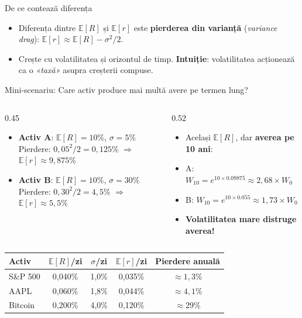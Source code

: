\documentclass[9pt, aspectratio=169, t]{beamer}
\theoremstyle{definition}
\newcommand{\E}{\mathbb{E}}
\begin{document}
\begin{frame}{De ce contează diferența}
\begin{itemize}\small\setlength{\itemsep}{0pt}
    \item Diferența dintre $\E[R]$ și $\E[r]$ este \textbf{pierderea din varianță} (\textit{variance drag}): $\E[r] \approx \E[R] - \sigma^2/2$.
    \item Crește cu volatilitatea și orizontul de timp. \textbf{Intuiție}: volatilitatea acționează ca o \textit{«taxă»} asupra creșterii compuse.
\end{itemize}
\vspace{0.05cm}
\begin{exampleblock}{Mini-scenariu: Care activ produce mai multă avere pe termen lung?}
\begin{columns}[T]
\begin{column}{0.45\textwidth}
\begin{itemize}\small\setlength{\itemsep}{1pt}
    \item \textbf{Activ A}: $\E[R] = 10\%$, $\sigma = 5\%$\\
    Pierdere: $0{,}05^2/2 = 0{,}125\%$ $\Rightarrow$ $\E[r] \approx 9{,}875\%$
    \item \textbf{Activ B}: $\E[R] = 10\%$, $\sigma = 30\%$\\
    Pierdere: $0{,}30^2/2 = 4{,}5\%$ $\Rightarrow$ $\E[r] \approx 5{,}5\%$
\end{itemize}
\end{column}
\begin{column}{0.52\textwidth}
\begin{itemize}\small\setlength{\itemsep}{1pt}
    \item Același $\E[R]$, dar \textbf{averea pe 10 ani}:
    \item A: $W_{10} = e^{10 \times 0.09875} \approx 2{,}68 \times W_0$
    \item B: $W_{10} = e^{10 \times 0.055} \approx 1{,}73 \times W_0$
    \item \textbf{Volatilitatea mare distruge averea!}
\end{itemize}
\end{column}
\end{columns}
\end{exampleblock}
\vspace{0.05cm}
\begin{center}
{\footnotesize
\renewcommand{\arraystretch}{1.1}
\begin{tabular}{lcccc}
\toprule
\textbf{Activ} & $\E[R]$/zi & $\sigma$/zi & $\E[r]$/zi & Pierdere anuală \\
\midrule
S\&P 500 & 0,040\% & 1,0\% & 0,035\% & $\approx 1{,}3\%$ \\
AAPL     & 0,060\% & 1,8\% & 0,044\% & $\approx 4{,}1\%$ \\
Bitcoin  & 0,200\% & 4,0\% & 0,120\% & $\approx 29\%$ \\
\bottomrule
\end{tabular}
}
\end{center}
\end{frame}
\end{document}
